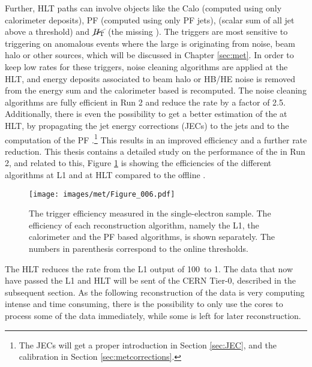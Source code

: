 \newpara
\noindent\justify
Further, HLT paths can involve objects like the Calo \ptmiss (computed using only calorimeter deposits), PF \ptmiss (computed using only PF jets), \HT (scalar sum of all jet \pt above a threshold) and $\cancel{H_{\mathrm{T}}}$ (the missing \HT). 
The \ptmiss triggers are most sensitive to triggering on anomalous events where the large \ptmiss is originating from noise, beam halo or other sources, which will be discussed in Chapter \ref{sec:met}. 
In order to keep low rates for these triggers, noise cleaning algorithms are applied at the HLT, and energy deposits associated to beam halo or HB/HE noise is removed from the energy sum and the calorimeter based \ptmiss is recomputed. 
The noise cleaning algorithms are fully efficient in Run 2 and reduce the rate by a factor of 2.5. 
Additionally, there is even the possibility to get a better estimation of the \ptmiss at HLT, by propagating the jet energy corrections (JECs) to the jets and to the computation of the PF \ptmiss.\footnote{The JECs will get a proper introduction in Section \ref{sec:JEC}, and the \ptmiss calibration in Section \ref{sec:metcorrections}.} 
This results in an improved efficiency and a further rate reduction. 
This thesis contains a detailed study on the performance of the \ptmiss in Run 2, and related to this, Figure \ref{fig:triggerMET} is showing the efficiencies of the different \ptmiss algorithms at L1 and at HLT compared to the offline \ptmiss.   
\begin{figure}[!htp]
  \centering
   \texttt{[image: images/met/Figure\_006.pdf]}
   \caption{The \ptmiss trigger efficiency measured in the single-electron sample. The efficiency of each reconstruction algorithm, namely the L1, the calorimeter and the PF based \ptmiss algorithms, is shown separately. The numbers in parenthesis correspond to the online \ptmiss thresholds.}
   \label{fig:triggerMET}
\end{figure}                                                                         
The HLT reduces the rate from the L1 output of 100\kHz\ to 1\kHz. 
The data that now have passed the L1 and HLT will be sent of the CERN Tier-0, described in the subsequent section. 
As the following reconstruction of the data is very computing intense and time consuming, there is the possibility to only use the cores to process some of the data immediately, while some is left for later reconstruction. 
